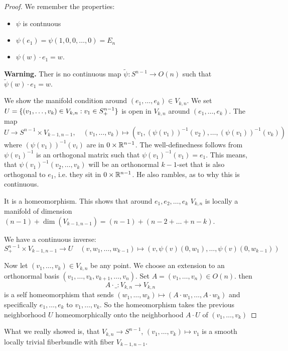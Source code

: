 \documentclass[language=english]{TemplateLecture}
\begin{document}
\begin{example}
\begin{proof}
        We remember the properties:
        \begin{itemize}
            \item \(\psi\) is contnuous
            \item \(\psi(e_1) = \psi(1,0,0,\dots, 0) = E_n\)
            \item \(\psi(w) \cdot e_1 = w\).
        \end{itemize}

        \textbf{Warning.} Ther is no continuous map \(\tilde \psi \colon S^{n-1} \to O(n)\) such that \(\tilde \psi (w) \cdot e_1 = w\).

        We show the manifold condition around \((e_1, \dots, e_k) \in V_{k,n}\). We set \(U = \{(v_1, \dots, v_k) \in V_{k,n} : v_1 \in S^{n-1}_+\}\) is open in \(V_{k,n}\) around \((e_1, \dots, e_k)\). The map
        \[U \to S^{n-1} \times V_{k-1, n-1}, \quad (v_1, \dots, v_k) \mapsto (v_1, (\psi(v_1))^{-1}(v_2), \dots, (\psi(v_1))^{-1}(v_k))\]
        where \((\psi(v_1))^{-1}(v_i)\) are in \(0 \times \mathbb{R}^{n-1}\). The well-definedness follows from \(\psi(v_1)^{-1}\) is an orthogonal matrix such that \(\psi(v_1)^{-1}(v_1) = e_1\). This means, that \(\psi(v_1)^{-1}(v_2, \dots, v_k)\) will be an orthonormal \(k-1\)-set that is also orthogonal to \(e_1\), i.e. they sit in \(0 \times \mathbb{R}^{n-1}\). He also rambles, as to why this is continuous.

        It is a homeomorphism. This shows that around \(e_1, e_2, \dots, e_k\) \(V_{k,n}\) is locally a manifold of dimension \((n-1) + \dim (V_{k-1,n-1}) = (n-1) + (n-2 + \dots + n-k)\).

        We have a continuous inverse:
        \[S^{n-1}_+ \times V_{k-1, n-1} \to U \quad (v, w_1, \dots, w_{k-1}) \mapsto (v, \psi(v)(0,w_1), \dots, \psi(v)(0,w_{k-1}))\]

        Now let \((v_1, \dots, v_k) \in V_{k,n}\) be any point. We choose an extension to an orthonormal basis \((v_1, \dots, v_k, v_{k+1} , \dots, v_n)\). Set \(A = (v_1, \dots, v_n) \in O(n)\). then
        \[A \cdot \_\colon V_{k,n} \to V_{k,n}\]
        is a self homeomorphism that sends \((w_1, \dots, w_k) \mapsto (A \cdot w_1, \dots, A \cdot w_k)\) and specifically \(e_1, \dots, e_k\) to \(v_1, \dots, v_k\). So the homeomorphism takes the previous neighborhood \(U\) homeomorphically onto the neighborhood \(A \cdot U\) of \((v_1, \dots, v_k)\)
    \end{proof}

    \begin{remark}
        What we really showed is, that \(V_{k,n} \to S^{n-1}\), \((v_1, \dots, v_k) \mapsto v_1\) is a smooth locally trivial fiberbundle with fiber \(V_{k-1, n-1}\).
    \end{remark}


\end{example}
\end{document}
